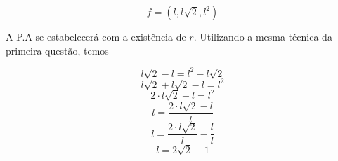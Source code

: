 \documentclass[11pt]{article}
\begin{document}
\begin{tcolorbox}[colback=LightYellow]
\[f = (l, l\sqrt{2}, l^{2})\]
\end{tcolorbox}

A P.A se estabelecerá com a existência de $r$. Utilizando a mesma técnica da primeira questão, temos

\begin{tcolorbox}[colback=LightYellow]
\[l\sqrt{2} - l = l^{2} - l\sqrt{2} \]
\[l\sqrt{2} + l\sqrt{2} - l = l^{2}\]
\[2\cdot l\sqrt{2} - l = l^{2}\]
\[l = \frac{2\cdot l\sqrt{2} - l}{l}\]
\[l = \frac{2\cdot l\sqrt{2}}{l} - \frac{l}{l}\]
\[l = 2\sqrt{2} - 1\]
\end{tcolorbox}
\end{document}
